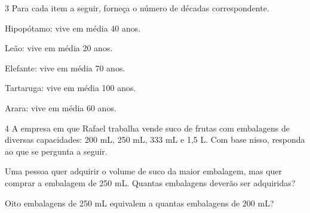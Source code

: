 
\num{3} Para cada item a seguir, forneça o número de décadas correspondente.

\begin{escolha}
\item Hipopótamo: vive em média 40 anos.\\


\item Leão: vive em média 20 anos.\\

\item Elefante: vive em média 70 anos.\\

\enlargethispage{3\baselineskip}
\item Tartaruga: vive em média 100 anos.\\

\item Arara: vive em média 60 anos.\\
\end{escolha}

\num{4} A empresa em que Rafael trabalha vende suco de frutas com embalagens de
diversas capacidades: 200 mL, 250 mL, 333 mL e 1,5 L. Com base nisso, responda ao que se pergunta a seguir.

\begin{escolha}
\item Uma pessoa quer adquirir o volume de suco da maior embalagem,
  mas quer comprar a embalagem de 250 mL. Quantas embalagens deverão ser adquiridas?\\

\item Oito embalagens de 250 mL equivalem a quantas embalagens de 200 mL?\\
\end{escolha}


